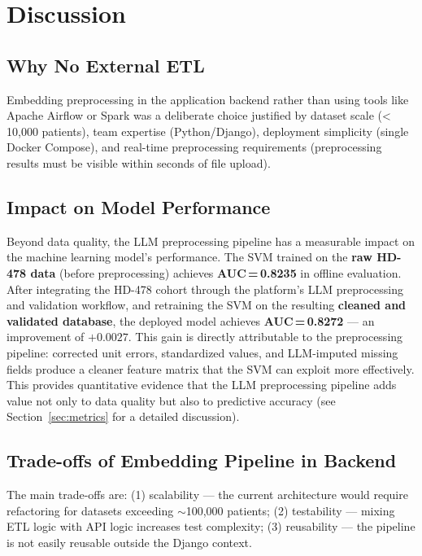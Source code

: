 \documentclass[12pt,a4paper,twoside]{report}
\begin{document}
\section{Discussion}\label{sec:ch4_discussion}

\subsection{Why No External ETL}

Embedding preprocessing in the application backend rather than using tools like Apache Airflow or Spark was a deliberate choice justified by dataset scale (< 10,000 patients), team expertise (Python/Django), deployment simplicity (single Docker Compose), and real-time preprocessing requirements (preprocessing results must be visible within seconds of file upload).

\subsection{Impact on Model Performance}

Beyond data quality, the LLM preprocessing pipeline has a measurable impact on the machine learning model's performance. The SVM trained on the \textbf{raw HD-478 data} (before preprocessing) achieves \textbf{AUC\,=\,0.8235} in offline evaluation. After integrating the HD-478 cohort through the platform's LLM preprocessing and validation workflow, and retraining the SVM on the resulting \textbf{cleaned and validated database}, the deployed model achieves \textbf{AUC\,=\,0.8272} --- an improvement of $+0.0027$. This gain is directly attributable to the preprocessing pipeline: corrected unit errors, standardized values, and LLM-imputed missing fields produce a cleaner feature matrix that the SVM can exploit more effectively. This provides quantitative evidence that the LLM preprocessing pipeline adds value not only to data quality but also to predictive accuracy (see Section~\ref{sec:metrics} for a detailed discussion).

\subsection{Trade-offs of Embedding Pipeline in Backend}

The main trade-offs are: (1) scalability --- the current architecture would require refactoring for datasets exceeding ${\sim}$100,000 patients; (2) testability --- mixing ETL logic with API logic increases test complexity; (3) reusability --- the pipeline is not easily reusable outside the Django context.
\end{document}
